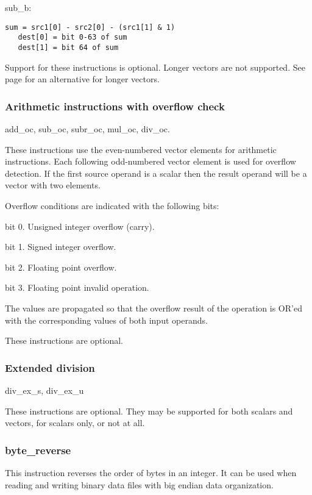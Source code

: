 \documentclass[forwardcom.tex]{subfiles}
\begin{document}
sub\_b:
\begin{lstlisting}[frame=none]
   sum = src1[0] - src2[0] - (src1[1] & 1)
   dest[0] = bit 0-63 of sum 
   dest[1] = bit 64 of sum
\end{lstlisting}

Support for these instructions is optional. Longer vectors are not supported. See page 
\pageref{highPrecisionArithmetic} for an alternative for longer vectors.

\subsubsection{Arithmetic instructions with overflow check} \label{instructionsWithOverflowCheck}
add\_oc, sub\_oc, subr\_oc, mul\_oc, div\_oc.
\vspace{2mm}

These instructions use the even-numbered vector elements for arithmetic instructions. Each following odd-numbered vector element is used for overflow detection. If the first source operand is a scalar then the result operand will be a vector with two elements.
\vspace{2mm}

Overflow conditions are indicated with the following bits:
\vspace{2mm}

bit 0. Unsigned integer overflow (carry).

bit 1. Signed integer overflow.

bit 2. Floating point overflow.

bit 3. Floating point invalid operation.
\vspace{2mm}

The values are propagated so that the overflow result of the operation is OR'ed with the corresponding values of both input operands.
\vspace{2mm}

These instructions are optional.

\subsubsection{Extended division} \label{extendedDivisionInstruction}
div\_ex\_s, div\_ex\_u
\vspace{2mm}

These instructions are optional. They may be supported for both scalars and vectors, for scalars only, or not at all.

\subsubsection{byte\_reverse}
This instruction reverses the order of bytes in an integer. It can be used when reading and writing binary data files with big endian data organization.
\end{document}
